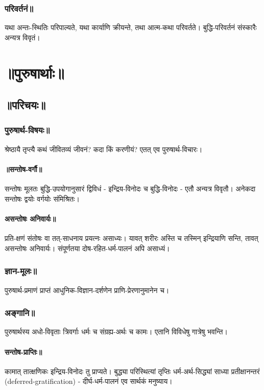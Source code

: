 \documentclass[oneside, article]{memoir}
\begin{document}
\section{परिवर्तनं॥}
यथा अन्तः-स्थितिः परिपाल्यते, यथा कार्याणि क्रीयन्ते, तथा आत्म-कथा परिवर्तते। बुद्धि-परिवर्तनं संस्कारैः अन्यत्र विवृतं।

\part{॥पुरुषार्थाः॥}
\chapter{॥परिचयः॥}
\section{पुरुषार्थ-विषयः॥}
श्रेष्ठायै तृप्त्यै कथं जीवितव्यं जीवनं? कदा किं करणीयं? एतत् एव पुरुषार्थ-विचारः।

\subsection{॥सन्तोष-वर्गौ॥}
सन्तोषः मूलतः बुद्धि-उपयोगानुसारं द्विविधं - इन्द्रिय-विनोदः च बुद्धि-विनोदः - एतौ अन्यत्र विवृतौ। अनेकदा सन्तोषः द्वयोः वर्गयोः संमिश्रितः।

\subsection{असन्तोषः अनिवार्यः॥}
प्रति-क्षणं संतोषः वा तत्-साधनाय प्रयत्नः असाध्यः। यावत् शरीरः अस्ति च तस्मिन् इन्द्रियाणि सन्ति, तावत् असन्तोषः अनिवार्यः। संपूर्णतया दोष-रहित-धर्म-पालनं अपि असाध्यं।

\section{ज्ञान-मूलः॥}
पुरुषार्थ-प्रमाणं प्राप्तं आधुनिक-विज्ञान-दर्शणेन प्राणि-प्रेरणानुमानेन च।

\section{अङ्गानि॥}
पुरुषार्थस्य अधो-विवृताः त्रिवर्गाः धर्मः च संग्रह्य-अर्थः च कामः। एतानि विविधेषु गात्रेषु भवन्ति।

\subsection{सन्तोष-प्राप्तिः॥}
कामात् तात्क्षणिकः इन्द्रिय-विनोदः तु प्राप्यते। बुद्ध्या परिस्थित्यां तृप्तिः धर्म-अर्थ-सिद्ध्यां साध्या प्रतीक्षानन्तरं (deferred-gratification) - दीर्घ-धर्म-पालनं एव सार्थकं मनुष्याय।
\end{document}
